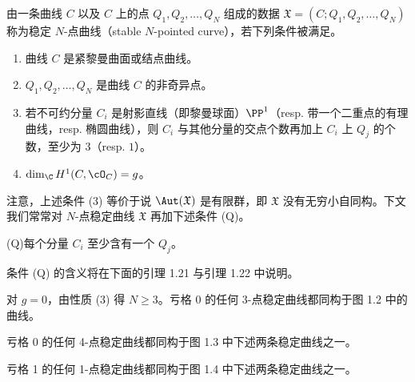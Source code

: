 \begin{definition}[1.16]
由一条曲线 $C$ 以及 $C$ 上的点 $Q_1,Q_2,\dots,Q_N$ 组成的数据 $\mathfrak{X}=(C;Q_1,Q_2,\dots,Q_N)$ 称为稳定 $N$-点曲线（stable $N$-pointed curve），若下列条件被满足。
\begin{enumerate}[label=(\arabic*)]
\item 曲线 $C$ 是紧黎曼曲面或结点曲线。
\item $Q_1,Q_2,\dots,Q_N$ 是曲线 $C$ 的非奇异点。
\item 若不可约分量 $C_i$ 是射影直线（即黎曼球面）$\PP^1$（resp. 带一个二重点的有理曲线，resp. 椭圆曲线），则 $C_i$ 与其他分量的交点个数再加上 $C_i$ 上 $Q_j$ 的个数，至少为 $3$（resp. $1$）。
\item $\dim_{\C}H^1(C,\cO_C)=g$。
\end{enumerate}
\end{definition}


注意，上述条件 (3) 等价于说 $\Aut(\mathfrak{X})$ 是有限群，即 $\mathfrak{X}$ 没有无穷小自同构。下文我们常常对 $N$-点稳定曲线 $\mathfrak{X}$ 再加下述条件 (Q)。

(Q)\quad 每个分量 $C_i$ 至少含有一个 $Q_j$。

条件 (Q) 的含义将在下面的引理 1.21 与引理 1.22 中说明。

\begin{example}[1.17]
对 $g=0$，由性质 (3) 得 $N\ge 3$。亏格 0 的任何 3-点稳定曲线都同构于图 1.2 中的曲线。

亏格 0 的任何 4-点稳定曲线都同构于图 1.3 中下述两条稳定曲线之一。

亏格 1 的任何 1-点稳定曲线都同构于图 1.4 中下述两条稳定曲线之一。
\end{example}


